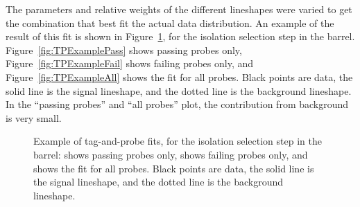 The parameters and relative weights of the different lineshapes 
were varied to get the combination that best fit 
the actual data distribution.  
An example of the result of this fit is shown in 
Figure~\ref{fig:TPExample}, 
for the isolation selection step in the barrel. 
Figure~\ref{fig:TPExamplePass} shows passing probes only, 
Figure~\ref{fig:TPExampleFail} shows failing probes only, 
and Figure~\ref{fig:TPExampleAll} shows the fit for all probes.  
Black points are data, the solid line is the signal lineshape, 
and the dotted line is the background lineshape.  
In the ``passing probes'' and ``all probes'' plot, 
the contribution from background is very small.  

 \begin{figure}[htb]
  \begin{center}
  \end{center}
  \caption[\fixspacing Example of tag-and-probe fits]
  {\fixspacing Example of tag-and-probe fits, 
  for the isolation selection step in the barrel: 
   shows passing probes only,
   shows failing probes only,
  and  shows the fit for all probes.
  Black points are data, the solid line is the signal lineshape,
  and the dotted line is the background lineshape.
  }
  \label{fig:TPExample}
 \end{figure}


